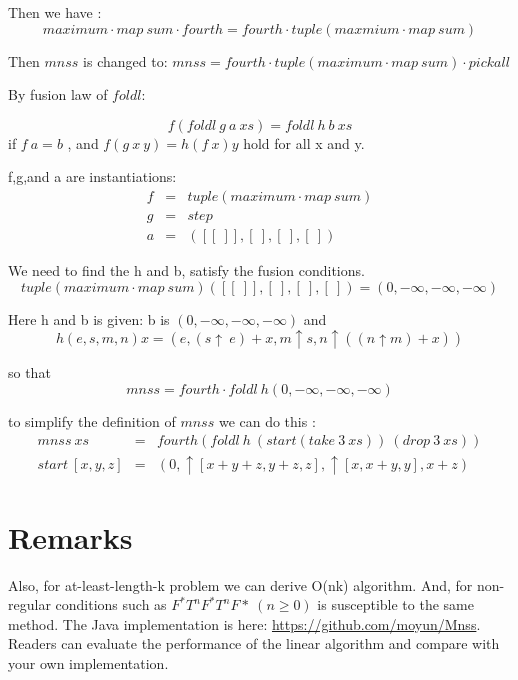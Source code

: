 \documentclass[10pt,a4paper]{article}
\begin{document}
Then we have :
\[
maximum \cdot map~ sum \cdot fourth = fourth \cdot tuple(maxmium \cdot map ~ sum)
\]

Then $mnss$ is changed to: \(mnss = fourth \cdot tuple( maximum \cdot map~sum)   \cdot pickall \)


By fusion law of $foldl$:

\[
f (foldl~ g~ a~xs) = foldl ~h~b~xs
\]
if \( f~a =b\) , and \(f(g~x~y)=h(f~x)y\) hold for all x and y.

f,g,and a are instantiations:
\[
\begin{array}{lll}
f &=& tuple(maximum \cdot map ~ sum) \\
g &=& step \\
a &=& ([[~]],[~],[~],[~])
\end{array}
\]

We need to find the h and b, satisfy the fusion conditions.
\[
tuple(maximum \cdot map ~ sum)([[~]],[~],[~],[~]) = (0,-\infty,-\infty,-\infty)
\]

Here h and b is given:
b is \((0,-\infty,-\infty,-\infty)\) and
\[
h(e,s,m,n) x = (e,(s \uparrow ~ e)+x ,m \uparrow s , n \uparrow( (n \uparrow m) +x) )
\]

so that 
\[
mnss = fourth \cdot foldl~h(0,-\infty,-\infty,-\infty)
\]

to simplify the definition of $mnss$ we can do this :
\[
\begin{array}{lll}
mnss ~ xs &=& fourth (foldl~h~(start(take~3~xs))~(drop~3~xs)) \\
start~[x,y,z] &=& (0, \uparrow[x+y+z,y+z,z], \uparrow[x,x+y,y], x+z)

\end{array}
\]

\section{Remarks}
Also, for at-least-length-k problem we can derive O(nk) algorithm.
And, for non-regular conditions such as \( F^*T^nF^*T^nF* ~ (n \geq 0)\) is susceptible
to the same method.
The Java implementation is here: \url{https://github.com/moyun/Mnss}.
Readers can evaluate the performance of the linear algorithm and compare with your own implementation.



	
	
\end{document}
